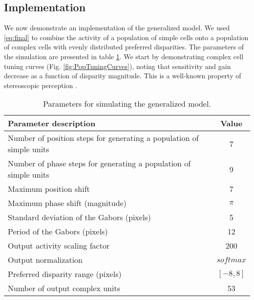 \subsection{Implementation}

We now demonstrate an implementation of the generalized model. We used \ref{eq:final} to combine the activity of a population of simple cells onto a population of complex cells with evenly distributed preferred disparities. The parameters of the simulation are presented in table \ref{table:simParams}. We start by demonstrating complex cell tuning curves (Fig. \ref{fig:PopTuningCurves}), noting that sensitivity and gain decrease as a function of disparity magnitude. This is a well-known property of stereoscopic perception \cite{Stevenson:1992kx}.

\begin{table}[ht]
  \footnotesize
  \centering 
  \begin{tabular}{l c}
    \hline                        %
    Parameter description & Value \\ [0.5ex]
    \hline %
    Number of position steps for generating a population of simple units & 7 \\
    Number of phase steps for generating a population of simple units & 9 \\
    Maximum position shift & 7 \\
    Maximum phase shift (magnitude) & $\pi$ \\
    Standard deviation of the Gabors (pixels) & 5 \\
    Period of the Gabors (pixels) & 12 \\
    Output activity scaling factor & 200 \\
    Output normalization & $softmax$ \\
    Preferred disparity range (pixels)& $[-8, 8]$ \\
    Number of output complex units & 53 \\ [1ex]      %
    \hline %
  \end{tabular}
  \caption{Parameters for simulating the generalized model.}
  \label{table:simParams}
\end{table}

